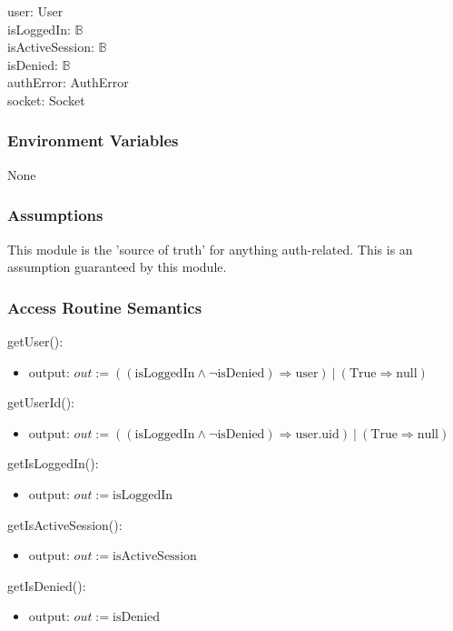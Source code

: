 \documentclass[12pt, titlepage]{article}
\begin{document}
user: User  \\
isLoggedIn: $\mathbb{B}$ \\
isActiveSession: $\mathbb{B}$ \\
isDenied: $\mathbb{B}$ \\
authError: AuthError \\
socket: Socket \\

\subsubsection{Environment Variables}

None

\subsubsection{Assumptions}

This module is the 'source of truth' for anything auth-related. This is an assumption guaranteed by this module.

\subsubsection{Access Routine Semantics}

\noindent getUser():
\begin{itemize}
\item output: $out := ((\text{isLoggedIn} \land \lnot \text{isDenied}) \Rightarrow \text{user}) \ | \ (\text{True} \Rightarrow \text{null})$
\end{itemize}

\noindent getUserId():
\begin{itemize}
\item output: $out := ((\text{isLoggedIn} \land \lnot \text{isDenied}) \Rightarrow \text{user.uid}) \ | \ (\text{True} \Rightarrow \text{null})$
\end{itemize}

\noindent getIsLoggedIn():
\begin{itemize}
\item output: $out := \text{isLoggedIn}$
\end{itemize}

\noindent getIsActiveSession():
\begin{itemize}
\item output: $out := \text{isActiveSession}$
\end{itemize}

\noindent getIsDenied():
\begin{itemize}
\item output: $out := \text{isDenied}$
\end{itemize}
\end{document}
